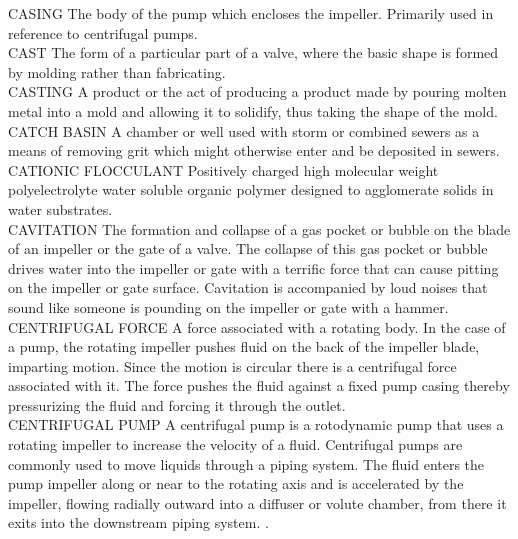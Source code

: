 CASING
The body of the pump which encloses the impeller. Primarily used in reference to centrifugal pumps.
\vspace{0.3cm}\\
CAST
The form of a particular part of a valve, where the basic shape is formed by molding rather than fabricating.
\vspace{0.3cm}\\
CASTING
A product or the act of producing a product made by pouring molten metal into a mold and allowing it to solidify, thus taking the shape of the mold.
\vspace{0.3cm}\\
CATCH BASIN
A chamber or well used with storm or combined sewers as a means of removing grit which might otherwise enter and be deposited in sewers. 
\vspace{0.3cm}\\
CATIONIC FLOCCULANT
Positively charged high molecular weight polyelectrolyte water soluble organic polymer designed to agglomerate solids in water substrates.
\vspace{0.3cm}\\
CAVITATION
The formation and collapse of a gas pocket or bubble on the blade of an impeller or the gate of a valve. The collapse of this gas pocket or bubble drives water into the impeller or gate with a terrific force that can cause pitting on the impeller or gate surface. Cavitation is accompanied by loud noises that sound like someone is pounding on the impeller or gate with a hammer.
\vspace{0.3cm}\\
CENTRIFUGAL FORCE
A force associated with a rotating body. In the case of a pump, the rotating impeller pushes fluid on the back of the impeller blade, imparting motion. Since the motion is circular there is a centrifugal force associated with it. The force pushes the fluid against a fixed pump casing thereby pressurizing the fluid and forcing it through the outlet.
\vspace{0.3cm}\\
CENTRIFUGAL PUMP
A centrifugal pump is a rotodynamic pump that uses a rotating impeller to increase the velocity of a fluid. Centrifugal pumps are commonly used to move liquids through a piping system. The fluid enters the pump impeller along or near to the rotating axis and is accelerated by the impeller, flowing radially outward into a diffuser or volute chamber, from there it exits into the downstream piping system. .
\vspace{0.3cm}\\
